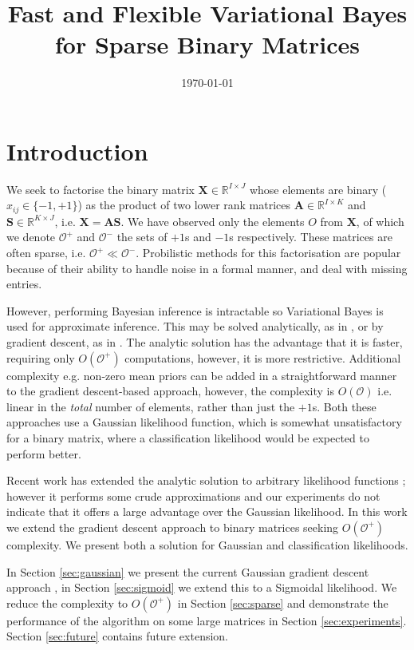 \documentclass{article}
\title{Fast and Flexible Variational Bayes for Sparse Binary Matrices}
\date{\today}
\newcommand{\obs}{O}
\newcommand{\X}{\mathbf{X}}
\newcommand{\A}{\mathbf{A}}
\newcommand{\s}{\mathbf{S}}
\begin{document}
\maketitle

\begin{abstract}

\end{abstract}

\section{Introduction}
We seek to factorise the binary matrix $\X\in\mathbb{R}^{I\times J}$ whose elements are binary ($x_{ij}\in\{-1,+1\}$) as the product of two lower rank matrices $\A\in\mathbb{R}^{I\times K}$ and $\s\in\mathbb{R}^{K\times J}$, i.e. $\X = \A\s$.
We have observed only the elements $\obs$ from $\X$, of which we denote $\mathcal{O}^+$ and $\mathcal{O}^-$ the sets of $+1$s and $-1$s respectively.
These matrices are often sparse, i.e. $\mathcal{O}^+ \ll \mathcal{O}^-$.
Probilistic methods for this factorisation are popular because of their ability to handle noise in a formal manner, and deal with missing entries. 

However, performing Bayesian inference is intractable so Variational Bayes is used for approximate inference.
This may be solved analytically, as in \citep{nakajima2010}, or by gradient descent, as in \citep{raiko2007}.
The analytic solution has the advantage that it is faster, requiring only $O(\mathcal{O}^+)$ computations, however, it is more restrictive.
Additional complexity e.g. non-zero mean priors can be added in a straightforward manner to the gradient descent-based approach,
however, the complexity is $O(\mathcal{O})$ i.e. linear in the \emph{total} number of elements, rather than just the $+1$s.
Both these approaches use a Gaussian likelihood function, which is somewhat unsatisfactory for a binary matrix, where a classification likelihood would be expected to perform better.

Recent work has extended the analytic solution to arbitrary likelihood functions \citep{seeger2012}; however it performs some crude approximations and our experiments do not indicate
that it offers a large advantage over the Gaussian likelihood. 
In this work we extend the gradient descent approach to binary matrices seeking $O(\mathcal{O}^+)$ complexity.
We present both a solution for Gaussian and classification likelihoods.

In Section \ref{sec:gaussian} we present the current Gaussian gradient descent approach \citep{raiko2007}, in Section \ref{sec:sigmoid} we extend this to a Sigmoidal likelihood. 
We reduce the complexity to $O(\mathcal{O}^+)$ in Section \ref{sec:sparse} and demonstrate the performance of the algorithm on some large matrices in Section \ref{sec:experiments}.
Section \ref{sec:future} contains future extension.
\end{document}
